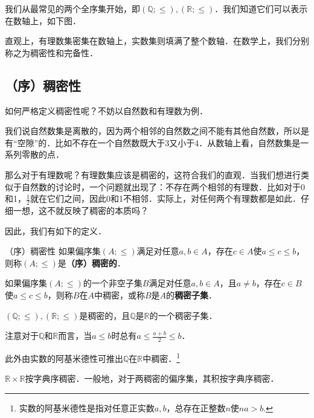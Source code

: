 
\begin{issues}
\issueDraft
\issueTODO
\end{issues}

我们从最常见的两个全序集开始，即$(\mathbb{Q};\leq),(\mathbb{R};\leq)$．我们知道它们可以表示在数轴上，如下图．


直观上，有理数集密集在数轴上，实数集则填满了整个数轴．在数学上，我们分别称之为稠密性和完备性．

\subsection{（序）稠密性}

如何严格定义稠密性呢？不妨以自然数和有理数为例．

我们说自然数集是离散的，因为两个相邻的自然数之间不能有其他自然数，所以是有“空隙”的．比如不存在一个自然数既大于3又小于4．从数轴上看，自然数集是一系列零散的点．

那么对于有理数呢？有理数集应该是稠密的，这符合我们的直观．当我们想进行类似于自然数的讨论时，一个问题就出现了：不存在两个相邻的有理数．比如对于0和1，$\frac{1}{2}$就在它们之间，因此0和1不相邻．实际上，对任何两个有理数都是如此．仔细一想，这不就反映了稠密的本质吗？

因此，我们有如下的定义．

\begin{definition}{（序）稠密性}
如果偏序集$(A;\leq)$满足对任意$a,b\in A$，存在$c\in A$使$a\leq c\leq b$，则称$(A;\leq)$是\textbf{（序）稠密的}．

如果偏序集$(A;\leq)$的一个非空子集$B$满足对任意$a,b\in A$，且$a\neq b$，存在$c\in B$使$a\leq c\leq b$，则称$B$在$A$中稠密，或称$B$是$A$的\textbf{稠密子集}．
\end{definition}

\begin{example}{}
$(\mathbb{Q};\leq),(\mathbb{R};\leq)$是稠密的，且$\mathbb{Q}$是$\mathbb{R}$的一个稠密子集．
\end{example}

注意对于$\mathbb{Q}$和$\mathbb{R}$而言，当$a\leq b$时总有$a\leq\frac{a+b}{2}\leq b$．

此外由实数的阿基米德性可推出$\mathbb{Q}$在$\mathbb{R}$中稠密．\footnote{实数的阿基米德性是指对任意正实数$a,b$，总存在正整数$n$使$na>b$.}

\begin{example}{}
$\mathbb{R}\times\mathbb{R}$按字典序稠密．一般地，对于两稠密的偏序集，其积按字典序稠密．
\end{example}

